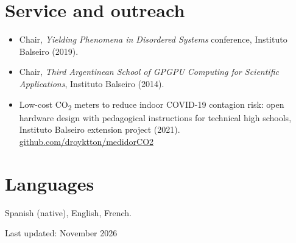 \documentclass[11pt,a4paper]{article}
\begin{document}
\section{Service and outreach}
\begin{itemize}
\item Chair, \emph{Yielding Phenomena in Disordered Systems} conference, Instituto Balseiro (2019).
\item Chair, \emph{Third Argentinean School of GPGPU Computing for Scientific Applications}, Instituto Balseiro (2014).
\item Low-cost CO\textsubscript{2} meters to reduce indoor COVID-19 contagion risk: open hardware design with
pedagogical instructions for technical high schools, Instituto Balseiro extension project (2021).
\href{https://github.com/droyktton/medidorCO2}{github.com/droyktton/medidorCO2}
\end{itemize}

\section{Languages}
Spanish (native), English, French.

\vfill
{\footnotesize\color{muted} Last updated: November 2026}
\end{document}
